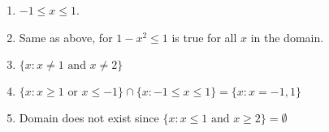 \begin{solution}
  \begin{enumerate}[label=(\roman*)]
    \item $-1 \leq x \leq 1$.
    \item Same as above, for $1 - x^2 \leq 1$ is true for all $x$ in the domain.
    \item $\{ x: x\neq1 \text{ and } x\neq2 \}$
    \item $\{ x: x \geq 1 \text{ or } x \leq -1 \} \cap
    \{ x: -1 \leq x \leq 1 \} = \{x: x = -1,1\}$
    \item Domain does not exist since $\{ x: x \leq 1 \text{ and } x \geq 2 \}
    = \emptyset$
  \end{enumerate}
\end{solution}
